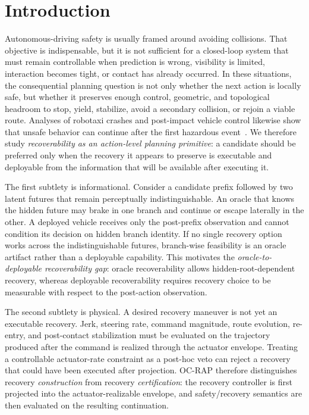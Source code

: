 \documentclass[conference]{IEEEtran}
\begin{document}
\section{Introduction}
\label{sec:introduction}

Autonomous-driving safety is usually framed around avoiding collisions. That objective is indispensable, but it is not sufficient for a closed-loop system that must remain controllable when prediction is wrong, visibility is limited, interaction becomes tight, or contact has already occurred. In these situations, the consequential planning question is not only whether the next action is locally safe, but whether it preserves enough control, geometric, and topological headroom to stop, yield, stabilize, avoid a secondary collision, or rejoin a viable route. Analyses of robotaxi crashes and post-impact vehicle control likewise show that unsafe behavior can continue after the first hazardous event~\cite{koopman2024anatomy,yang2025post,ghosh2026post,wang2024post}. We therefore study \emph{recoverability as an action-level planning primitive}: a candidate should be preferred only when the recovery it appears to preserve is executable and deployable from the information that will be available after executing it.

The first subtlety is informational. Consider a candidate prefix followed by two latent futures that remain perceptually indistinguishable. An oracle that knows the hidden future may brake in one branch and continue or escape laterally in the other. A deployed vehicle receives only the post-prefix observation and cannot condition its decision on hidden branch identity. If no single recovery option works across the indistinguishable futures, branch-wise feasibility is an oracle artifact rather than a deployable capability. This motivates the \emph{oracle-to-deployable recoverability gap}: oracle recoverability allows hidden-root-dependent recovery, whereas deployable recoverability requires recovery choice to be measurable with respect to the post-action observation.

The second subtlety is physical. A desired recovery maneuver is not yet an executable recovery. Jerk, steering rate, command magnitude, route evolution, re-entry, and post-contact stabilization must be evaluated on the trajectory produced after the command is realized through the actuator envelope. Treating a controllable actuator-rate constraint as a post-hoc veto can reject a recovery that could have been executed after projection. OC-RAP therefore distinguishes recovery \emph{construction} from recovery \emph{certification}: the recovery controller is first projected into the actuator-realizable envelope, and safety/recovery semantics are then evaluated on the resulting continuation.
\end{document}
